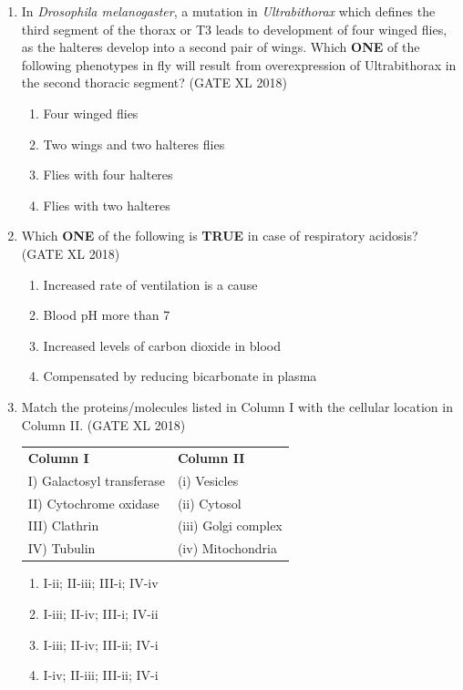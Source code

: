 \documentclass[14pt]{extarticle}
\begin{document}
\begin{flushleft}
\begin{enumerate}
\item In \textit{Drosophila melanogaster}, a mutation in \textit{Ultrabithorax} which defines the third segment of the thorax or T3 leads to development of four winged flies, as the halteres develop into a 
second pair of wings. Which \textbf{ONE} of the following phenotypes in fly will result from 
overexpression of Ultrabithorax in the second thoracic segment? 
    \hfill(GATE XL 2018)\\
    \begin{multicols}{2}
    \begin{enumerate}[label=(\Alph*)]
        \item Four winged flies
        \item Two wings and two halteres flies
        \item Flies with four halteres
        \item Flies with two halteres
    \end{enumerate}
    \end{multicols}

    \item Which \textbf{ONE} of the following is \textbf{TRUE} in case of respiratory acidosis? \hfill(GATE XL 2018)\\
    \begin{enumerate}[label=(\Alph*)]
        \item Increased rate of ventilation is a cause
        \item Blood pH more than 7
        \item Increased levels of carbon dioxide in blood
        \item Compensated by reducing bicarbonate in plasma
    \end{enumerate}

    \item Match the proteins/molecules listed in Column I with the cellular location in Column II. \hfill(GATE XL 2018)\\
\begin{tabular}{p{6cm} p{6cm}}
\textbf{Column I} & \textbf{Column II} \\
I) Galactosyl transferase & (i) Vesicles \\
II) Cytochrome oxidase & (ii) Cytosol \\
III) Clathrin & (iii) Golgi complex \\
IV) Tubulin & (iv) Mitochondria \\
\end{tabular}
    \begin{multicols}{2}
    \begin{enumerate}[label=(\Alph*)]
        \item I-ii; II-iii; III-i; IV-iv
        \item I-iii; II-iv; III-i; IV-ii
        \item I-iii; II-iv; III-ii; IV-i
        \item I-iv; II-iii; III-ii; IV-i
    \end{enumerate}
    \end{multicols}


\end{enumerate}
\end{flushleft}
\end{document}
